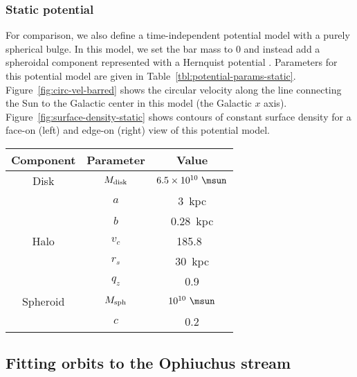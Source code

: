 \documentclass[letterpaper,12pt,preprint]{aastex}
\begin{document}
\subsubsection{Static potential}

For comparison, we also define a time-independent potential model with a purely spherical bulge. In this model, we set the bar mass to 0 and instead add a spheroidal component represented with a Hernquist potential \citep{hernquist90}. Parameters for this potential model are given in Table~\ref{tbl:potential-params-static}. Figure~\ref{fig:circ-vel-barred} shows the circular velocity along the line connecting the Sun to the Galactic center in this model (the Galactic $x$ axis). Figure~\ref{fig:surface-density-static} shows contours of constant surface density for a face-on (left) and edge-on (right) view of this potential model.

\begin{table*}[ht]
\begin{center}
	\begin{tabular}{ c | c | c }
	         \toprule
	         Component & Parameter & Value \\\toprule
		Disk & $M_{\rm disk}$ & $6.5 \times 10^{10}~\msun$ \\
		& $a$ & 3~{\rm kpc}\\
		& $b$ & 0.28~{\rm kpc} \\\midrule
	         Halo & $v_c$ & 185.8~\kms\\
		& $r_s$ & 30~kpc \\
		& $q_z$ & 0.9 \\\midrule
		Spheroid & $M_{\rm sph}$ & $10^{10}~\msun$ \\
		& $c$ & 0.2 \\
		\bottomrule
		\end{tabular}
	\caption{Same as Table~\ref{tbl:potential-params-barred}, except: the disk mass is increased to account for removing the bar component, a spheroidal bulge component is added. \label{tbl:potential-params-static}}
\end{center}
\end{table*}

\subsection{Fitting orbits to the Ophiuchus stream}\label{sec:orbitfit}
\end{document}
